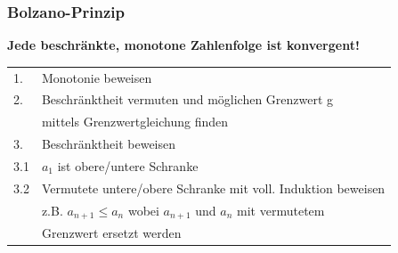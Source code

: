 		\subsubsection{Bolzano-Prinzip}
			\textbf{Jede beschränkte, monotone Zahlenfolge ist konvergent!} \\
				\begin{tabular}{ll}
					1. & Monotonie beweisen \\
					2. &  Beschränktheit vermuten und möglichen Grenzwert g \\ 
					   & mittels Grenzwertgleichung finden  \\
					3. & Beschränktheit beweisen \\
					3.1 & $a_1$ ist obere/untere Schranke \\
					3.2 & Vermutete untere/obere Schranke mit voll. Induktion beweisen \\
					    & z.B. $a_{n+1} \leq a_n$ wobei $a_{n+1}$ und $a_n$ mit vermutetem \\
					    & Grenzwert ersetzt werden \\
				\end{tabular}
			
